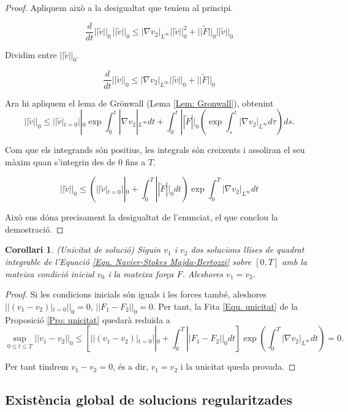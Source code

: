 \documentclass{article}
\numberwithin{equation}{section}
\newtheorem{corollari}{Corol\textperiodcentered lari}[section]
\begin{document}
\begin{proof}
Apliquem aix\`{o} a la desigualtat que ten\'{i}em al principi.

\[\frac{d}{dt}||\tilde{v}||_0\,||\tilde{v}||_0\leq|\nabla v_2|_{L^{\infty}}||\tilde{v}||_0^2+||\tilde{F}||_0||\tilde{v}||_0\]

Dividim entre $||\tilde{v}||_0$.

\[\frac{d}{dt}||\tilde{v}||_0\leq|\nabla v_2|_{L^{\infty}}||\tilde{v}||_0+||\tilde{F}||_0\]

Ara hi apliquem el lema de Gr\"{o}nwall (Lema \ref{Lem: Gronwall}), obtenint
\[||\tilde{v}||_0\leq||\tilde{v}|_{t=0}||_0\exp\int_0^t|\nabla v_2|_{L^{\infty}}dt+\int_0^t||\tilde{F}||_0\left(\exp\int_s^t|\nabla v_2|_{L^{\infty}}d\tau\right)ds.\]

Com que els integrands s\'{o}n positius, les integrals s\'{o}n creixents i assoliran el seu m\`{a}xim quan s'integrin des de $0$ fins a $T$.

\[||\tilde{v}||_0\leq\left(||\tilde{v}|_{t=0}||_0+\int_0^T||\tilde{F}||_0dt\right)\exp\int_0^T|\nabla v_2|_{L^{\infty}}dt\]

Aix\`{o} ens d\'{o}na precisament la desigualtat de l'enunciat, el que conclou la demostraci\'{o}.
\end{proof}

\begin{corollari}\label{Cor: unicitat}
(Unicitat de soluci\'{o}) Siguin $v_1$ i $v_2$ dos solucions llises de quadrat integrable de l'Equaci\'{o} \eqref{Equ. Navier-Stokes Majda-Bertozzi} sobre $[0,T]$ amb la mateixa condici\'{o} inicial $v_0$ i la mateixa for\c{c}a $F$. Aleshores $v_1=v_2$.
\end{corollari}
\begin{proof}
Si les condicions inicials s\'{o}n iguals i les forces tamb\'{e}, aleshores $||(v_1-v_2)|_{t=0}||_0=0$, $||F_1-F_2||_0=0$. Per tant, la Fita \eqref{Equ. unicitat} de la Proposici\'{o} \ref{Pro: unicitat} quedar\`{a} redu\"{i}da a
\[\sup_{0\leq t\leq T}||v_1-v_2||_0\leq\left[||(v_1-v_2)|_{t=0}||_0+\int_0^T||F_1-F_2||_0dt\right]\exp\left(\int_0^T|\nabla v_2|_{L^{\infty}}dt\right)=0.\]

Per tant tindrem $v_1-v_2=0$, \'{e}s a dir, $v_1=v_2$ i la unicitat queda provada.
\end{proof}

\subsection{Exist\`{e}ncia global de solucions regularitzades}
\end{document}
